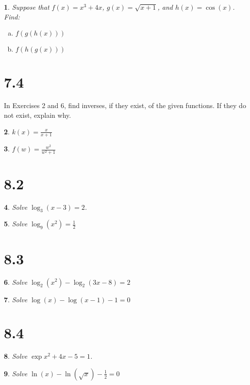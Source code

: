\documentclass[12pt]{amsart}
\theoremstyle{plain}
\newtheorem{thm}{}
\begin{document}
\setcounter{thm}{3}
\begin{thm}
  Suppose that $f(x) = x^3 + 4x$, $g(x) = \sqrt{x + 1}$, and $h(x) = \cos(x)$.
  Find: 
  \begin{enumerate}[(a)]
  \item
    $\displaystyle{f(g(h(x)))}$
  \item
    $\displaystyle{f(h(g(x)))}$
  \end{enumerate}
\end{thm}

\newpage
\section*{7.4}

In Exercises 2 and 6, find inverses, if they exist, of the given functions.  If they do not exist, explain why.
\setcounter{thm}{1}

\begin{thm}
  $\displaystyle{k(x) = \frac{x}{x+1}}$
\end{thm}

\setcounter{thm}{5}
\begin{thm}
  $f(w) = \displaystyle{\frac{w^2}{w^2 + 1}}$
\end{thm}

\newpage
\section*{8.2}

\setcounter{thm}{5}
\begin{thm}
  Solve $\displaystyle{\log_3(x - 3) = 2}$.
\end{thm}

\setcounter{thm}{7}
\begin{thm}
  Solve $\displaystyle{\log_9(x^2) = \frac{1}{2}}$
\end{thm}

\newpage
\section*{8.3}

\setcounter{thm}{5}
\begin{thm}
  Solve $\displaystyle{\log_2(x^2) - \log_2(3x - 8) = 2}$
\end{thm}

\setcounter{thm}{9}
\begin{thm}
  Solve $\displaystyle{\log(x) - \log(x-1) - 1 = 0}$
\end{thm}

\newpage
\section*{8.4}

\setcounter{thm}{7}
\begin{thm}
  Solve $\displaystyle{\exp{x^2 + 4x - 5} = 1}$.
\end{thm}

\setcounter{thm}{13}
\begin{thm}
  Solve $\displaystyle{\ln(x) - \ln(\sqrt{x}) - \frac{1}{2} = 0}$
\end{thm}
\end{document}
